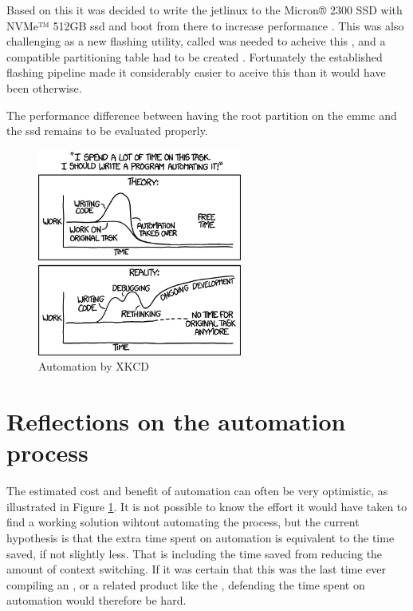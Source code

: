 Based on this it was decided to write the \gls{jetlinux} to the Micron® 2300 SSD with NVMe™ 512GB \gls{ssd} and boot from there to increase performance \cite{microntechnologyMicron2300SSD2020}.
This was also challenging as a new flashing utility, called  was needed to acheive this \cite{rigerunNVIDIAJetpackFlashing2021}, and a compatible partitioning table had to be created \cite{nvidiaPartitionConfigurationJetson2022}.
Fortunately the established flashing pipeline made it considerably easier to aceive this than it would have been otherwise.

The performance difference between having the root partition on the \gls{emmc} and the \gls{ssd} remains to be evaluated properly.

\begin{figure}[H]
    \centering
    \includegraphics[width=0.6\textwidth]{figures/xkcd_automation.png}
    \caption{Automation by XKCD \cite{xkcdAutomation2014}}
    \label{fig:xkcd_automation}
\end{figure}

\section{Reflections on the automation process}
The estimated cost and benefit of automation can often be very optimistic, as illustrated in Figure \ref{fig:xkcd_automation}.
It is not possible to know the effort it would have taken to find a working solution wihtout automating the process, but the current hypothesis is that the extra time spent on automation is equivalent to the time saved, if not slightly less.
That is including the time saved from reducing the amount of context switching.
If it was certain that this was the last time ever compiling an \jx, or a related \jetson product like the \jo, defending the time spent on automation would therefore be hard.


